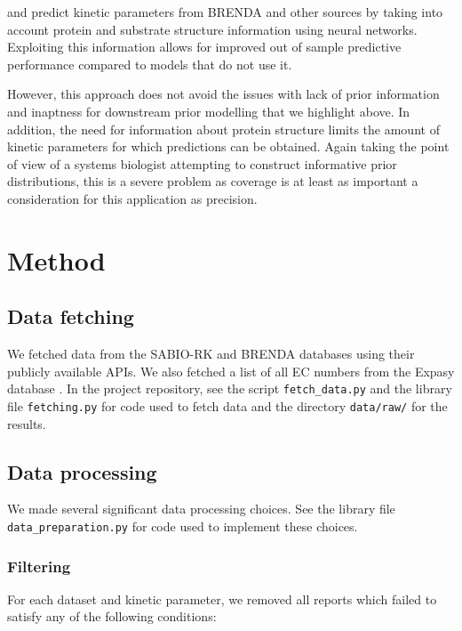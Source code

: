 \documentclass[11pt]{article}
\begin{document}
 and  predict
kinetic parameters from BRENDA and other sources by taking into account protein
and substrate structure information using neural networks. Exploiting this
information allows for improved out of sample predictive performance compared to
models that do not use it.

However, this approach does not avoid the issues with lack of prior information
and inaptness for downstream prior modelling that we highlight above. In
addition, the need for information about protein structure limits the amount of
kinetic parameters for which predictions can be obtained. Again taking the point
of view of a systems biologist attempting to construct informative prior
distributions, this is a severe problem as coverage is at least as important a
consideration for this application as precision.

\section{Method}
\label{sec:org21ec188}
\subsection{Data fetching}
\label{sec:orgb834723}
We fetched data from the SABIO-RK 
and BRENDA  databases using their publicly
available APIs. We also fetched a list of all EC numbers from the Expasy
database . In the project repository,
see the script \texttt{fetch\_data.py} and the library file \texttt{fetching.py} for code used
to fetch data and the directory \texttt{data/raw/} for the results.

\subsection{Data processing}
\label{sec:org29c1dbe}
We made several significant data processing choices. See the library file
\texttt{data\_preparation.py} for code used to implement these choices.

\subsubsection{Filtering}
\label{sec:orgeb3fb80}
For each dataset and kinetic parameter, we removed all reports which failed to
satisfy any of the following conditions:
\end{document}
